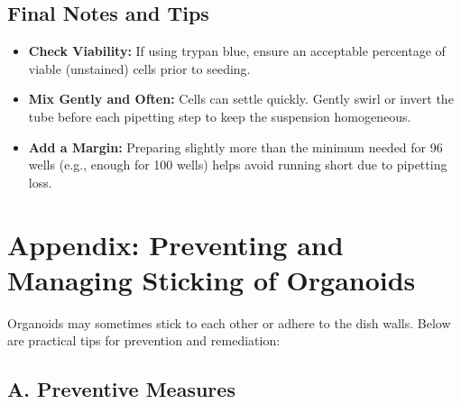 \documentclass[11pt]{article}
\begin{document}
\subsection{Final Notes and Tips}

\begin{itemize}[leftmargin=*]
    \item \textbf{Check Viability:} If using trypan blue, ensure an acceptable percentage of viable (unstained) cells prior to seeding.
    \item \textbf{Mix Gently and Often:} Cells can settle quickly. Gently swirl or invert the tube before each pipetting step to keep the suspension homogeneous.
    \item \textbf{Add a Margin:} Preparing slightly more than the minimum needed for 96 wells (e.g., enough for 100 wells) helps avoid running short due to pipetting loss.
\end{itemize}

\section{Appendix: Preventing and Managing Sticking of Organoids}
\label{sec:sticking_app}

Organoids may sometimes stick to each other or adhere to the dish walls. Below are practical tips for prevention and remediation:

\subsection{A. Preventive Measures}
\end{document}

